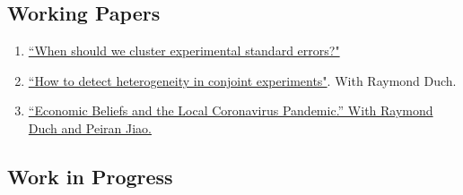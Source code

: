 \documentclass[11pt, a4paper]{article}
\begin{document}
\subsection*{Working Papers}

\begin{enumerate}


\item \href{https://ts-robinson.com/publication/robinson-whenshouldwe-2020/robinson-whenshouldwe-2020.pdf}{``When should we cluster experimental standard errors?" }

\item \href{https://ts-robinson.com/publication/robinson-conjoint-2021/robinson-conjoint-2021.pdf}{``How to detect heterogeneity in conjoint experiments"}.  With Raymond Duch.

\item \href{https://papers.ssrn.com/sol3/papers.cfm?abstract_id=3948756}{``Economic Beliefs and the Local Coronavirus Pandemic.'' With Raymond Duch and Peiran Jiao.}


\end{enumerate}

\subsection*{Work in Progress}
\end{document}
